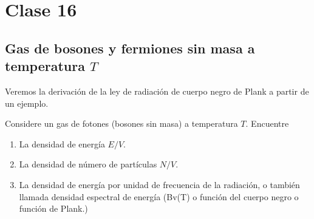 \section{Clase 16}
\subsection{Gas de bosones y fermiones sin masa a temperatura $T$}
Veremos la derivación de la ley de radiación de cuerpo negro de Plank a partir de un ejemplo.

\begin{ej}
	Considere un gas de fotones (bosones sin masa) a temperatura $T$. Encuentre
	\begin{enumerate}
		\item La densidad de energía $E/V$.
		\item La densidad de número de partículas $N/V$.
		\item La densidad de energía por unidad de frecuencia de la radiación, o también llamada densidad espectral de energía (Bv(T) o función del cuerpo negro o función de Plank.)
	\end{enumerate}
\end{ej}

